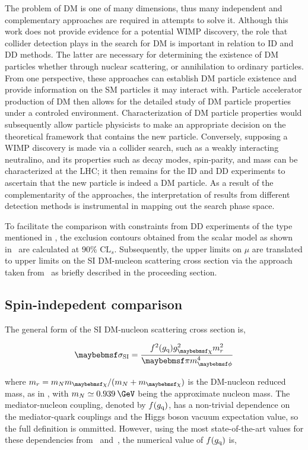 The problem of DM is one of many dimensions, thus many independent and complementary approaches are required in attempts to solve it. Although this work does not provide evidence for a potential WIMP discovery, the role that collider detection plays in the search for DM is important in relation to ID and DD methods. The latter are necessary for determining the existence of DM particles whether through nuclear scattering, or annihilation to ordinary particles. From one perspective, these approaches can establish DM particle existence and provide information on the SM particles it may interact with. Particle accelerator production of DM then allows for the detailed study of DM particle properties under a controled environment. Characterization of DM particle properties would subsequently allow particle physicists to make an appropriate decision on the theoretical framework that contains the new particle. Conversely, supposing a WIMP discovery is made via a collider search, such as a weakly interacting neutralino, and its properties such as decay modes, spin-parity, and mass can be characterized at the LHC; it then remains for the ID and DD experiments to ascertain that the new particle is indeed a DM particle. As a result of the complementarity of the approaches, the interpretation of results from different detection methods is instrumental in mapping out the search phase space.

To facilitate the comparison with constraints from DD experiments of the type mentioned in , the exclusion contours obtained from the scalar \ttDM model as shown in~ are calculated at $90\%$ $\textrm{CL}_{s}$. Subsequently, the upper limits on $\mu$ are translated to upper limits on the SI DM-nucleon scattering cross section via the approach taken from~\cite{Boveia:2016mrp} as briefly described in the proceeding section.

\subsection{Spin-indepedent comparison}
\label{subsec:SIcase}

The general form of the SI DM-nucleon scattering cross section is,

\begin{equation}
  \sigma_{\textrm{SI}} = \frac{f^{2}(\gq)\gDM^{2}m_r^2}{\pi\mMed^{4}}
  \label{eq:DDtranslation}
\end{equation}

where $m_r = m_{N}\mDM/(m_{N}+\mDM)$ is the DM-nucleon reduced mass, as in , with $m_{N} \simeq 0.939\:\GeV$ being the approximate nucleon mass. The mediator-nucleon coupling, denoted by $f(g_{\text{q}})$, has a non-trivial dependence on the mediator-quark couplings and the Higgs boson vacuum expectation value, so the full definition is ommitted. However, using the most state-of-the-art values for these dependencies from~\cite{Hoferichter:2015dsa} and~\cite{Junnarkar:2013ac}, the numerical value of $f(g_{\text{q}})$ is,

